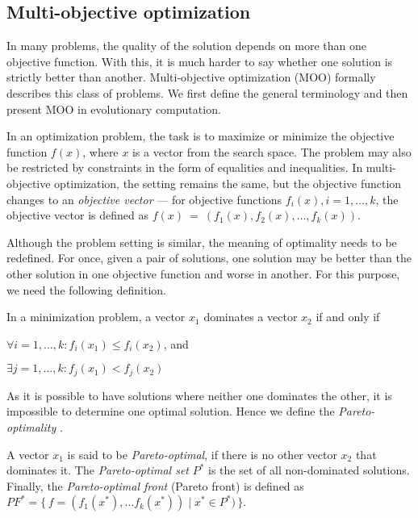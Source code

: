 \subsection{Multi-objective optimization} \label{moo}
In many problems, the quality of the solution depends on more than one
objective function. With this, it is much harder to say whether one solution
is strictly better than another. Multi-objective optimization (MOO) formally
describes this class of problems. We first define the general terminology
and then present MOO in evolutionary computation.

In an optimization problem, the task is to maximize or minimize the objective
function $f(x)$, where $x$ is a vector from the search space. The problem may
also be restricted by constraints in the form of equalities and inequalities.
In multi-objective optimization, the setting remains the same, but the
objective function changes to an \emph{objective vector} ---
for objective functions $f_i(x), i = 1,\ldots,k$, the objective vector is 
defined as $f(x)~=~(f_1(x), f_2(x), \ldots, f_k(x))$.

Although the problem setting is similar, the meaning of optimality needs to 
be redefined. For once, given a pair of solutions, one solution may be better 
than the other solution in one objective function and worse in another. For 
this purpose, we need the following definition.

\begin{definition}[Domination]
In a minimization problem, a vector $x_1$ dominates a vector $x_2$ if and 
only if 
\begin{compactitem}
\item $\forall i=1,\ldots,k: f_i(x_1) \leq f_i(x_2)$, and
\item $\exists j=1,\ldots,k: f_j(x_1) < f_j(x_2)$
\end{compactitem}
\end{definition}

As it is possible to have solutions where neither one dominates the other,
it is impossible to determine one optimal solution. Hence we define the 
\emph{Pareto-optimality}
\citep[p.~551-561,~569--573]{Engelbrecht:2007:CII:1557464}.

\begin{definition}
A vector $x_1$ is said to be \emph{Pareto-optimal}, if there is no other vector
$x_2$ that dominates it. The \emph{Pareto-optimal set} $P^*$ is the set of all
non-dominated solutions. Finally, the \emph{Pareto-optimal front} (Pareto front)
is defined as
$PF^* =\{\, f=(f_1(x^*),\ldots f_k(x^*)) \mid x^* \in P^* ) \,\}$. 
\end{definition}

